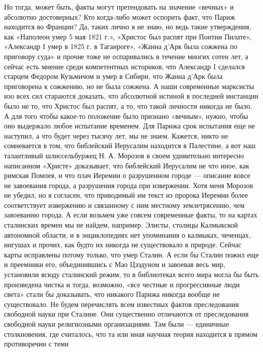 Но тогда, может быть, факты  могут претендовать на значение «вечных» и
абсолютно достоверных?  Кто когда-либо может оспорить  факт, что Париж
находится  во Франции?  Да,  таких  лично я  не  знаю,  но ведь  такие
утверждения, как  «Наполеон умер 5  мая 1821 г.», «Христос  был распят
при Понтии Пилате»,  «Александр I умер в 1825 г.  в Таганроге», «Жанна
д'Арк была сожжена по приговору суда»  и прочие тоже не оспаривались в
течение  многих сотен  лет, а  сейчас есть  мнение среди  компетентных
историков, что Александр I сделался старцем Федором Кузьмичом и умер в
Сибири,  что Жанна  д'Арк  была  приговорена к  сожжению,  но не  была
сожжена. А наши современные марксисты изо всех сил стараются доказать,
что абсолютной истиной  в последней инстанции было не  то, что Христос
был распят, а то, что такой личности никогда не было. А для того чтобы
какое-то положение было признано  «вечным», нужно, чтобы оно выдержало
любое испытание временем.  Для Парижа срок испытания  еще не наступил,
а  что  будет  через  тысячу  лет, мы  не  знаем.  Кажется,  никто  не
сомневается в том,  что библейский Иерусалим находится  в Палестине, а
вот наш талантливый  шлиссельбуржец Н. А. Морозов  в своем удивительно
интересно написанном «Христе» доказывает,  что библейский Иерусалим не
что  иное,  как римская  Помпея,  и  что  плач Иеремии  о  разрушенном
городе ---  описание вовсе не  завоевания города, а  разрушения города
при  извержении. Хотя  меня  Морозов  не убедил,  но  я согласен,  что
приводимый им текст из  пророка Иеремии более соответствует извержению
и связанному  с ним местному  землетрясению, чем завоеванию  города. А
если возьмем  уже совсем  современные факты,  то на  картах сталинских
времен мы  не найдем, например, Элисты,  столицы Калмыкской автономной
области,  и  в  энциклопедиях  нет упоминания  о  калмыках,  чеченцах,
ингушах  и прочих,  как будто  их никогда  не существовало  в природе.
Сейчас  карты исправлены  потому только,  что умер  Сталин. А  если бы
Сталин  пожил еще  и преемники  его,  объединившись с  Мао Цзэдуном  и
завоевав весь мир, установили всюду сталинский режим, то в библиотеках
всего мира  могла бы быть  произведена чистка и тогда,  возможно, «все
честные и прогрессивные люди света»  стали бы доказывать, что никакого
Парижа  никогда  вообще не  существовало.  Не  будем перечислять  всем
известных  фактов  преследования  свободной  науки  при  Сталине.  Они
существенно отличаются  от преследования свободной  науки религиозными
организациями. Там были --- единичные столкновения, где считалось, что
та  или иная  научная теория  находится в  прямом противоречии  с теми
